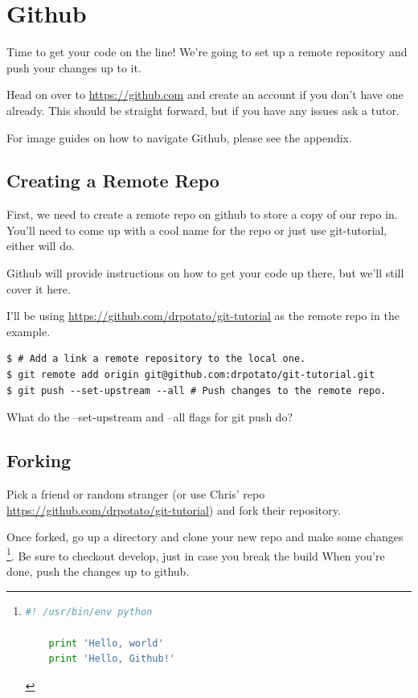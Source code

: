\documentclass{tufte-handout}
\begin{document}
\section{Github}

\noindent Time to get your code on the line! We're going to set up a remote
repository and push your changes up to it.

\noindent Head on over to \url{https://github.com} and create an account if you
don't have one already. This should be straight forward, but if you have any
issues ask a tutor.

\noindent For image guides on how to navigate Github, please see the appendix.

\subsection{Creating a Remote Repo}

\noindent First, we need to create a remote repo on github to store a copy of
our repo in. You'll need to come up with a cool name for the repo or just use
git-tutorial, either will do.

\noindent Github will provide instructions on how to get your code up there,
but we'll still cover it here.

\noindent I'll be using \url{https://github.com/drpotato/git-tutorial} as the
remote repo in the example.

\begin{lstlisting}
$ # Add a link a remote repository to the local one.
$ git remote add origin git@github.com:drpotato/git-tutorial.git
$ git push --set-upstream --all # Push changes to the remote repo.
\end{lstlisting}

\noindent What do the --set-upstream and --all flags for git push do?

\subsection{Forking}
\noindent Pick a friend or random stranger (or use Chris' repo 
\url{https://github.com/drpotato/git-tutorial}) and fork their repository.

\noindent Once forked, go up a directory and clone your new repo and make some
changes \cprotect\footnote{
	\begin{lstlisting}[language=Python]
	#! /usr/bin/env python

	print 'Hello, world'
	print 'Hello, Github!'
	\end{lstlisting}
}. Be sure to checkout develop, just in case you break the build When you're
done, push the changes up to github.
\end{document}
